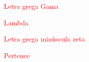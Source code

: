 \begin{simbolos}
\item[\textcolor{red}{$ \Gamma $}] \textcolor{red}{Letra grega Gama}
\item[\textcolor{red}{$ \Lambda $}] \textcolor{red}{Lambda}
\item[\textcolor{red}{$ \zeta $}] \textcolor{red}{Letra grega minúscula zeta}
\item[\textcolor{red}{$ \in $}] \textcolor{red}{Pertence}
\end{simbolos}